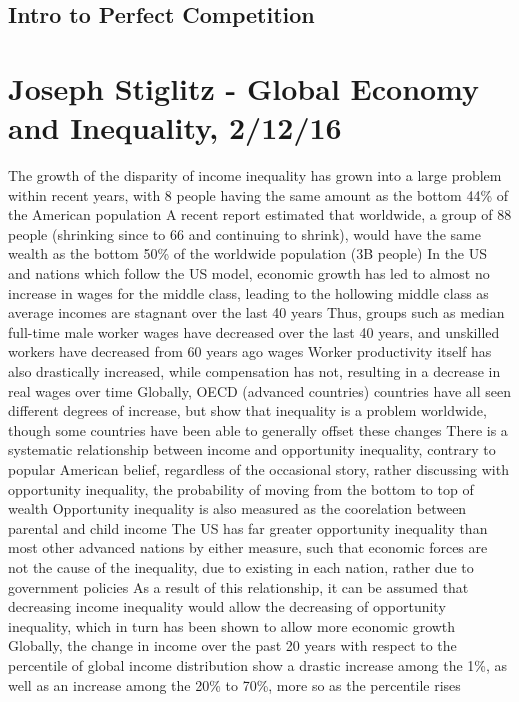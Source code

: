 \documentclass[11 pt, twoside]{article}
\newenvironment{outline*}
{
	\begin{outline}[enumerate]
	}
	{\end{outline}
}
\begin{document}
\subsection{Intro to Perfect Competition}
\begin{outline*}
\1
\end{outline*}
\section{Joseph Stiglitz - Global Economy and Inequality, 2/12/16}
\begin{outline*}
\1 The growth of the disparity of income inequality has grown into a large problem within recent years, with 8 people having the same amount as the bottom 44\% of the American population
\2 A recent report estimated that worldwide, a group of 88 people (shrinking since to 66 and continuing to shrink), would have the same wealth as the bottom 50\% of the worldwide population (3B people)
\2 In the US and nations which follow the US model, economic growth has led to almost no increase in wages for the middle class, leading to the hollowing middle class as average incomes are stagnant over the last 40 years
\3 Thus, groups such as median full-time male worker wages have decreased over the last 40 years, and unskilled workers have decreased from 60 years ago wages
\2 Worker productivity itself has also drastically increased, while compensation has not, resulting in a decrease in real wages over time
\2 Globally, OECD (advanced countries) countries have all seen different degrees of increase, but show that inequality is a problem worldwide, though some countries have been able to generally offset these changes
\1 There is a systematic relationship between income and opportunity inequality, contrary to popular American belief, regardless of the occasional story, rather discussing with opportunity inequality, the probability of moving from the bottom to top of wealth
\2 Opportunity inequality is also measured as the coorelation between parental and child income
\2 The US has far greater opportunity inequality than most other advanced nations by either measure, such that economic forces are not the cause of the inequality, due to existing in each nation, rather due to government policies
\1 As a result of this relationship, it can be assumed that decreasing income inequality would allow the decreasing of opportunity inequality, which in turn has been shown to allow more economic growth
\1 Globally, the change in income over the past 20 years with respect to the percentile of global income distribution show a drastic increase among the 1\%, as well as an increase among the 20\% to 70\%, more so as the percentile rises

\end{outline*}
\end{document}
